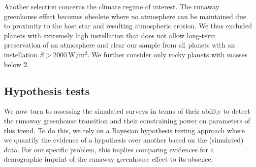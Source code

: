 \documentclass[modern]{aastex631}
\begin{document}
\begin{note}
    Another selection concerns the climate regime of interest.
    The runaway greenhouse effect becomes obsolete where no atmosphere can be maintained due to proximity to the host star and resulting atmospheric erosion.
    We thus excluded planets with extremely high instellation that does not allow long-term preservation of an atmosphere and clear our sample from all planets with an instellation $S > \SI{2000}{\watt\per\square\meter}$.
    We further consider only rocky planets with masses below \SI{2}{\Mearth}. %
\end{note}


\subsection{Hypothesis tests}
We now turn to assessing the simulated surveys in terms of their ability to detect the runaway greenhouse transition and their constraining power on parameters of this trend.
To do this, we rely on a Bayesian hypothesis testing approach where we quantify the evidence of a hypothesis over another based on the (simulated) data.
For our specific problem, this implies comparing evidences for a demographic imprint of the runaway greenhouse effect to its absence.
\end{document}
